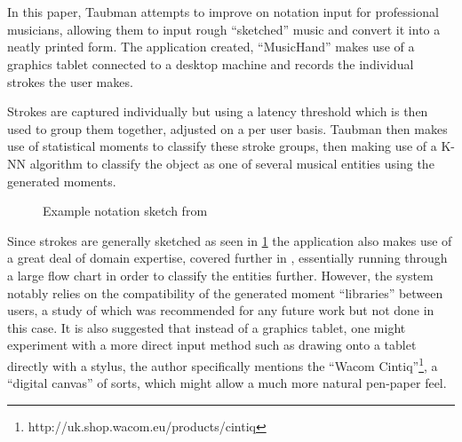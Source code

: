 \section {\cite{taubman2005musichand}}

In this paper, Taubman attempts to improve on notation input for professional musicians, allowing them to input rough ``sketched'' music and convert it into a neatly printed form. The application created, ``MusicHand'' makes use of a graphics tablet connected to a desktop machine and records the individual strokes the user makes.

Strokes are captured individually but using a latency threshold which is then used to group them together, adjusted on a per user basis. Taubman then makes use of statistical moments  to classify these stroke groups, then making use of a K-NN algorithm to classify the object as one of several musical entities using the generated moments.

\begin{figure}[h]
  \centering
  \caption{Example notation sketch from \cite{taubman2005musichand}}
  \label{fig:taubman-sketch}
\end{figure}

Since strokes are generally sketched as seen in \ref{fig:taubman-sketch} the application also makes use of a great deal of domain expertise, covered further in , essentially running through a large flow chart in order to classify the entities further. However, the system notably relies on the compatibility of the generated moment ``libraries'' between users, a study of which was recommended for any future work but not done in this case. It is also suggested that instead of a graphics tablet, one might experiment with a more direct input method such as drawing onto a tablet directly with a stylus, the author specifically mentions the ``Wacom Cintiq''\footnote{http://uk.shop.wacom.eu/products/cintiq}, a ``digital canvas'' of sorts, which might allow a much more natural pen-paper feel.


